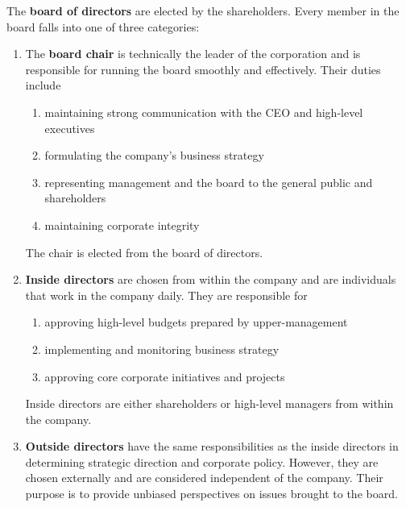 \documentclass{article}
\begin{document}
    \begin{definition}
      The \textbf{board of directors} are elected by the shareholders. Every member in the board falls into one of three categories: 
      \begin{enumerate}
        \item The \textbf{board chair} is technically the leader of the corporation and is responsible for running the board smoothly and effectively. Their duties include
        \begin{enumerate}
          \item maintaining strong communication with the CEO and high-level executives
          \item formulating the company's business strategy
          \item representing management and the board to the general public and shareholders
          \item maintaining corporate integrity
        \end{enumerate}
        The chair is elected from the board of directors. 

        \item \textbf{Inside directors} are chosen from within the company and are individuals that work in the company daily. They are responsible for
        \begin{enumerate}
          \item approving high-level budgets prepared by upper-management
          \item implementing and monitoring business strategy
          \item approving core corporate initiatives and projects
        \end{enumerate}
        Inside directors are either shareholders or high-level managers from within the company. 

        \item \textbf{Outside directors} have the same responsibilities as the inside directors in determining strategic direction and corporate policy. However, they are chosen externally and are considered independent of the company. Their purpose is to provide unbiased perspectives on issues brought to the board. 
      \end{enumerate}
    \end{definition}
\end{document}
